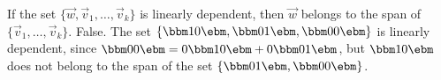 {If the set $\{\vec{w},\vec{v}_1,\ldots, \vec{v}_k\}$ is linearly dependent, then $\vec{w}$ belongs to the span of $\{\vec{v}_1,\ldots, \vec{v}_k\}$.}
{False. The set $\left\{\bbm 1\\0\ebm, \bbm 0\\1\ebm, \bbm 0\\0\ebm\right\}$ is linearly dependent, since $\bbm 0\\0\ebm = 0\bbm 1\\0\ebm+0\bbm 0\\1\ebm$, but $\bbm 1\\0\ebm$ does not belong to the span of the set $\left\{\bbm 0\\1\ebm, \bbm 0\\0\ebm\right\}$.}
